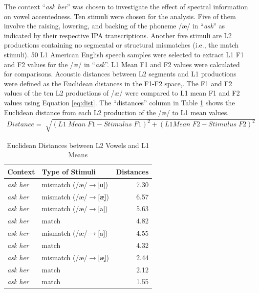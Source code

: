 The context “\textit{ask her}” was chosen to investigate the effect of spectral information on vowel accentedness. Ten stimuli were chosen for the analysis. Five of them involve the raising, lowering, and backing of the phoneme /æ/ in “\textit{ask}” as indicated by their respective IPA transcriptions. Another five stimuli are L2 productions containing no segmental or structural mismatches (i.e., the match stimuli). 50 L1 American English speech samples were selected to extract L1 F1 and F2 values for the /æ/ in “\textit{ask}”. L1 Mean F1 and F2 values were calculated for comparisons. Acoustic distances between L2 segments and L1 productions were defined as the Euclidean distances in the F1-F2 space,. The F1 and F2 values of the ten L2 productions of /æ/ were compared to L1 mean F1 and F2 values using Equation \ref{eq:dist}. The “distances” column in Table \ref{tab:dist} shows the Euclidean distance from each L2 production of the /æ/ to L1 mean values. 
  \figSpace
\begin{align}
\label{eq:dist}
Distance = \sqrt[]{(L1\; Mean  \; F1 - Stimulus \; F1)^2 + (L1 Mean\; F2 - Stimulus \; F2)^2}
\end{align}
\begin{table}[h]
  \figSpace
  \centering
  \caption{Euclidean Distances between L2 Vowels and L1 Means}
    \begin{tabular}{llr}
    \toprule
    Context & Type of Stimuli & Distances \\
    \midrule
    \textit{ask her} & mismatch (/æ/$\rightarrow$[ɑ]) & 7.30 \\
    \textit{ask her} & mismatch (/æ/$\rightarrow$[æ̞]) & 6.57 \\
    \textit{ask her} & mismatch (/æ/$\rightarrow$[a]) & 5.63 \\
    \textit{ask her} & match & 4.82 \\
    \textit{ask her} & mismatch (/æ/$\rightarrow$[a]) & 4.55 \\
    \textit{ask her} & match & 4.32 \\
    \textit{ask her} & mismatch (/æ/$\rightarrow$[æ̝]) & 2.44 \\
    \textit{ask her} & match & 2.12 \\
    \textit{ask her} & match & 1.55 \\
    \bottomrule
    \end{tabular}%
  \label{tab:dist}%
    \figSpace
\end{table}%

